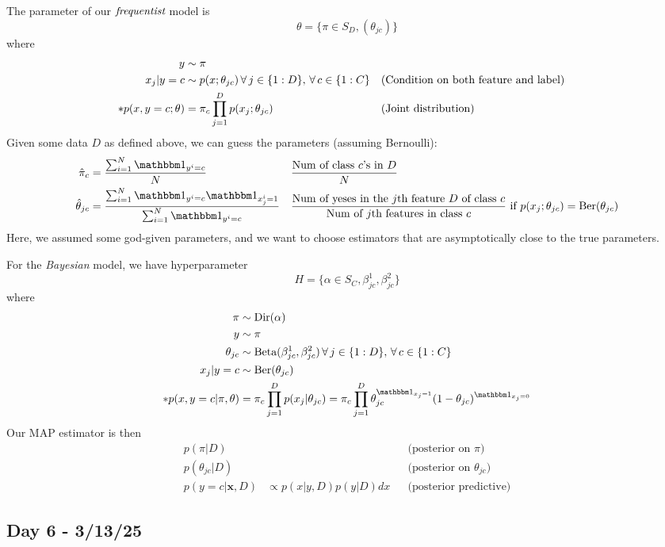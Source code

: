 \documentclass{chaistyle}
\begin{document}
The parameter of our \(\emph{frequentist}\) model is \[\theta=\{\pi\in S_D, (\theta_{jc})\}\] where \begin{align*}
    y &\sim \pi \\ 
    x_j|y=c &\sim p(x;\theta_{jc}) \,\forall\, j\in\{1:D\},\,\forall\, c\in\{1:C\} &&\text{(Condition on both feature and label)} \\
    *p(x,y=c;\theta) &= \pi_c\prod_{j=1}^{D}p(x_j;\theta_{jc}) &&\text{(Joint distribution)} \\
\end{align*}
Given some data \(D\) as defined above, we can guess the parameters (assuming Bernoulli): \begin{align*}
    \hat{\pi}_c &= \frac{\sum_{i=1}^{N}\indic_{y^i=c}}{N} && \frac{\text{Num of class \(c\)'s in \(D\)}}{N} \\
    \hat{\theta}_{jc} &= \frac{\sum_{i=1}^{N}\indic_{y^i=c}\indic_{x_j^i=1}}{\sum_{i=1}^{N}\indic_{y^i=c}} && \frac{\text{Num of yeses in the \(j\)th feature \(D\) of class \(c\)}}{\text{Num of \(j\)th features in class \(c\)}}\text{ if \(p(x_j;\theta_{jc})=\text{Ber}(\theta_{jc})\)} \\
\end{align*}
Here, we assumed some god-given parameters, and we want to choose estimators that are asymptotically close to the true parameters. 

For the \emph{Bayesian} model, we have hyperparameter \[H=\{\alpha\in S_C,\beta^1_{jc},\beta^2_{jc}\}\] where \begin{align*}
    \pi&\sim\text{Dir}(\alpha) \\
    y&\sim\pi \\ 
    \theta_{jc} &\sim \text{Beta}(\beta^1_{jc},\beta^2_{jc}) \,\fa j\in\{1:D\},\,\fa c\in\{1:C\} \\
    x_j|y=c&\sim \text{Ber}(\theta_{jc}) \\
    *p(x,y=c|\pi,\theta)&=\pi_c\prod_{j=1}^{D}p(x_j|\theta_{jc})=\pi_c\prod_{j=1}^{D} \theta_{jc}^{\indic_{x_j=1}} (1-\theta_{jc})^{\indic_{x_j=0}} \\
\end{align*}
Our MAP estimator is then \begin{align*}
    p(\pi|D)&   &&\text{(posterior on \(\pi\))} \\
    p(\theta_{jc}|D)&  &&\text{(posterior on \(\theta_{jc}\))} \\
    p(y=c|\mathbf{x},D)&\propto p(x|y,D)p(y|D) dx &&\text{(posterior predictive)}
\end{align*}
\subsection*{Day 6 - 3/13/25}
\end{document}
